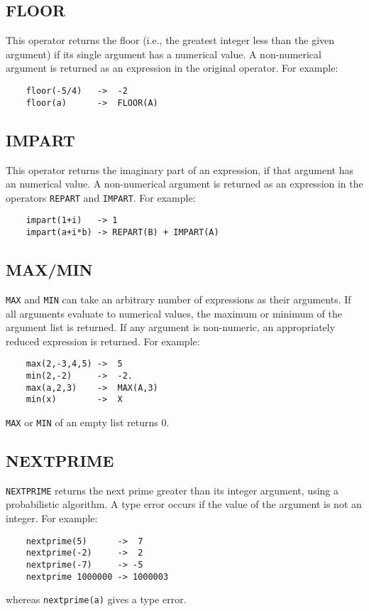 \subsection{FLOOR}
\hypertarget{operator:FLOOR}{}
This operator returns the floor (i.e., the greatest integer less than
the given argument) if its single argument has a numerical value.  A
non-numerical argument is returned as an expression in the original
operator.  For example:

\begin{verbatim}
	floor(-5/4)   ->  -2
	floor(a)      ->  FLOOR(A)
\end{verbatim}

\subsection{IMPART}
\hypertarget{operator:IMPART}{}
This operator returns the imaginary part of an expression, if that argument
has an numerical value.  A non-numerical argument is returned as an expression
in the operators {\tt REPART} and {\tt IMPART}.  For example:
\begin{verbatim}
	impart(1+i)   -> 1
	impart(a+i*b) -> REPART(B) + IMPART(A)
\end{verbatim}

\subsection{MAX/MIN}
\hypertarget{operator:MAX}{}
\hypertarget{operator:MIN}{}

{\tt MAX} and {\tt MIN} can take an arbitrary
number of expressions as their arguments.  If all arguments evaluate to
numerical values, the maximum or minimum of the argument list is returned.
If any argument is non-numeric, an appropriately reduced expression is
returned.  For example:
\begin{verbatim}
	max(2,-3,4,5) ->  5
	min(2,-2)     ->  -2.
	max(a,2,3)    ->  MAX(A,3)
	min(x)        ->  X
\end{verbatim}
{\tt MAX} or {\tt MIN} of an empty list returns 0.

\subsection{NEXTPRIME}
\hypertarget{operator:NEXTPRIME}{}

{\tt NEXTPRIME} returns the next prime greater than its integer argument,
using a probabilistic algorithm.  A type error occurs if the value of the
argument is not an integer.  For example:
\begin{verbatim}
	nextprime(5)      ->  7
	nextprime(-2)     ->  2
	nextprime(-7)     -> -5
	nextprime 1000000 -> 1000003
\end{verbatim}
whereas {\tt nextprime(a)} gives a type error.

